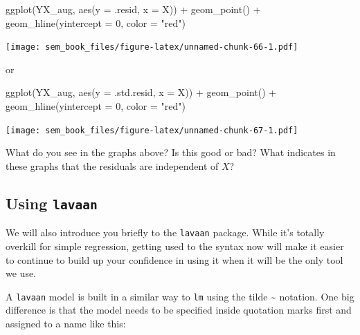 \documentclass[
]{book}
\newenvironment{Shaded}{\begin{snugshade}}{\end{snugshade}}
\newcommand{\AttributeTok}[1]{\textcolor[rgb]{0.77,0.63,0.00}{#1}}
\newcommand{\DecValTok}[1]{\textcolor[rgb]{0.00,0.00,0.81}{#1}}
\newcommand{\FunctionTok}[1]{\textcolor[rgb]{0.00,0.00,0.00}{#1}}
\newcommand{\NormalTok}[1]{#1}
\newcommand{\SpecialCharTok}[1]{\textcolor[rgb]{0.00,0.00,0.00}{#1}}
\newcommand{\StringTok}[1]{\textcolor[rgb]{0.31,0.60,0.02}{#1}}
\begin{document}
\begin{Shaded}
\begin{Highlighting}[]
\FunctionTok{ggplot}\NormalTok{(YX\_aug, }\FunctionTok{aes}\NormalTok{(}\AttributeTok{y =}\NormalTok{ .resid, }\AttributeTok{x =}\NormalTok{ X)) }\SpecialCharTok{+}
    \FunctionTok{geom\_point}\NormalTok{() }\SpecialCharTok{+}
    \FunctionTok{geom\_hline}\NormalTok{(}\AttributeTok{yintercept =} \DecValTok{0}\NormalTok{, }\AttributeTok{color =} \StringTok{"red"}\NormalTok{)}
\end{Highlighting}
\end{Shaded}

\texttt{[image: sem\_book\_files/figure-latex/unnamed-chunk-66-1.pdf]}

or

\begin{Shaded}
\begin{Highlighting}[]
\FunctionTok{ggplot}\NormalTok{(YX\_aug, }\FunctionTok{aes}\NormalTok{(}\AttributeTok{y =}\NormalTok{ .std.resid, }\AttributeTok{x =}\NormalTok{ X)) }\SpecialCharTok{+}
    \FunctionTok{geom\_point}\NormalTok{() }\SpecialCharTok{+}
    \FunctionTok{geom\_hline}\NormalTok{(}\AttributeTok{yintercept =} \DecValTok{0}\NormalTok{, }\AttributeTok{color =} \StringTok{"red"}\NormalTok{)}
\end{Highlighting}
\end{Shaded}

\texttt{[image: sem\_book\_files/figure-latex/unnamed-chunk-67-1.pdf]}

What do you see in the graphs above? Is this good or bad? What indicates in these graphs that the residuals are independent of \(X\)?

\hypertarget{simple-r-lavaan}{%
\subsection{\texorpdfstring{Using \texttt{lavaan}}{Using lavaan}}\label{simple-r-lavaan}}

We will also introduce you briefly to the \texttt{lavaan} package. While it's totally overkill for simple regression, getting used to the syntax now will make it easier to continue to build up your confidence in using it when it will be the only tool we use.

A \texttt{lavaan} model is built in a similar way to \texttt{lm} using the tilde \textasciitilde{} notation. One big difference is that the model needs to be specified inside quotation marks first and assigned to a name like this:
\end{document}
